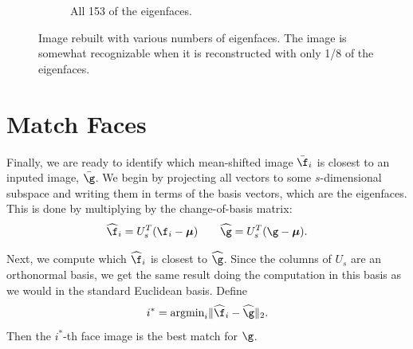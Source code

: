 \begin{figure}
\begin{subfigure}[b]{0.3\textwidth}
\caption{All 153 of the eigenfaces.}
\label{fig:all_efaces}
\end{subfigure}
\caption{Image rebuilt with various numbers of eigenfaces. The image is somewhat recognizable when it is reconstructed with only 1/8 of the eigenfaces.}
\label{fig:rebuiltImage}
\end{figure}

\section*{Match Faces}
Finally, we are ready to identify which mean-shifted image $\bar{\f}_i$ is closest to an inputed image, $\bar{\g}$. 
We begin by projecting all vectors to some $s$-dimensional subspace and writing them in terms of the basis vectors, which are the eigenfaces. 
This is done by multiplying by the change-of-basis matrix:
\[
\widehat{\f}_i = U_s^T(\f_i-{\boldsymbol \mu}) \qquad \widehat{\g} = U_s^T(\g-{\boldsymbol \mu}).
\]

Next, we compute which $\widehat{\f}_i$ is closest to $\widehat{\g}$. 
Since the columns of $U_s$ are an orthonormal basis, we get the same result doing the computation in this basis as we would in the standard Euclidean basis.
Define
\[
i^* = \text{argmin}_i \|\widehat{\f}_i - \widehat{\g}\|_2.
\]
Then the $i^*$-th face image is the best match for $\g$.

